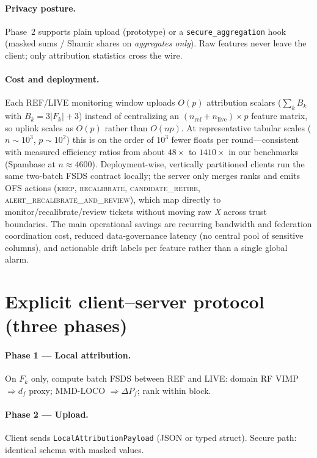 \paragraph{Privacy posture.}
Phase~2 supports plain upload (prototype) or a \texttt{secure\_aggregation} hook (masked sums / Shamir shares on \emph{aggregates only}).
Raw features never leave the client; only attribution statistics cross the wire.

\paragraph{Cost and deployment.}
Each REF/LIVE monitoring window uploads $O(p)$ attribution scalars ($\sum_k B_k$ with $B_k=3|F_k|{+}3$) instead of centralizing an $(n_{\mathrm{ref}}{+}n_{\mathrm{live}}){\times}p$ feature matrix, so uplink scales as $O(p)$ rather than $O(np)$.
At representative tabular scales ($n{\sim}10^3$, $p{\sim}10^2$) this is on the order of $10^3$ fewer floats per round---consistent with measured efficiency ratios from about $48{\times}$ to $1410{\times}$ in our benchmarks (Spambase at $n{\approx}4600$).
Deployment-wise, vertically partitioned clients run the same two-batch FSDS contract locally; the server only merges ranks and emits OFS actions (\textsc{keep}, \textsc{recalibrate}, \textsc{candidate\_retire}, \textsc{alert\_recalibrate\_and\_review}), which map directly to monitor/recalibrate/review tickets without moving raw \emph{X} across trust boundaries.
The main operational savings are recurring bandwidth and federation coordination cost, reduced data-governance latency (no central pool of sensitive columns), and actionable drift labels per feature rather than a single global alarm.

\section{Explicit client--server protocol (three phases)}

\paragraph{Phase 1 --- Local attribution.}
On $F_k$ only, compute batch FSDS between REF and LIVE: domain RF VIMP $\Rightarrow d_f$ proxy; MMD-LOCO $\Rightarrow \Delta P_f$; rank within block.

\paragraph{Phase 2 --- Upload.}
Client sends \texttt{LocalAttributionPayload} (JSON or typed struct). Secure path: identical schema with masked values.

